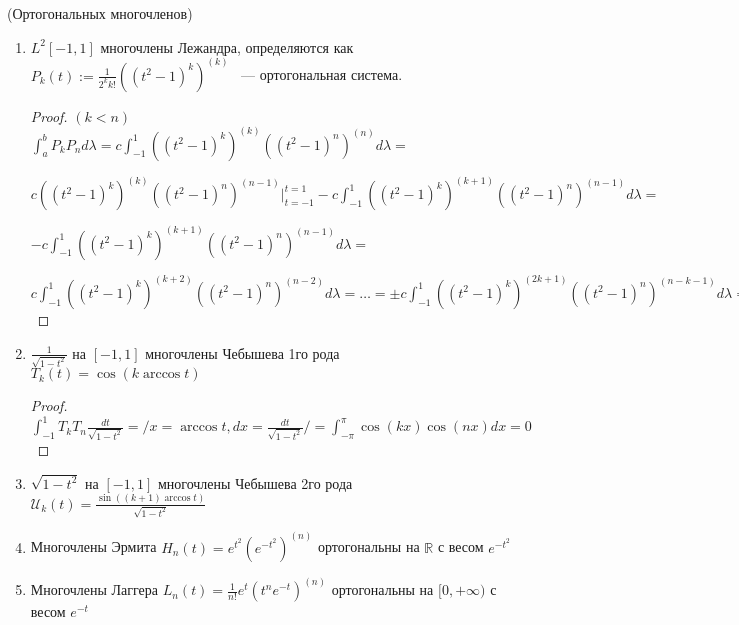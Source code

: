   \begin{examples} (Ортогональных многочленов)
  	\begin{enumerate}
		\item $L^2[-1, 1]$ многочлены Лежандра, определяются как $P_k(t) := \frac{1}{2^k k!}((t^2 - 1)^k)^{(k)}$ ~--- ортогональная система.
		
		\begin{proof}
		$(k < n)$ $\int_a^b P_k P_n d\lambda = c  \int_{-1}^1 ((t^2 - 1)^k)^{(k)}((t^2 - 1)^n)^{(n)} d\lambda
		=$
		
		$  c((t^2 - 1)^k)^{(k)}((t^2 - 1)^n)^{(n - 1)} \Big|_{t = -1}^{t = 1} -
		 c \int_{-1}^1 ((t^2 - 1)^k)^{(k + 1)}((t^2 - 1)^n)^{(n - 1)} d\lambda =$
		 
		 $ -
		 c \int_{-1}^1 ((t^2 - 1)^k)^{(k + 1)}((t^2 - 1)^n)^{(n - 1)} d\lambda =$
		 
		 $c \int_{-1}^1 ((t^2 - 1)^k)^{(k + 2)}((t^2 - 1)^n)^{(n - 2)} d\lambda = \ldots =
		 \pm c \int_{-1}^1 ((t^2 - 1)^k)^{(2k + 1)}((t^2 - 1)^n)^{(n - k - 1)} d\lambda= 0$
		 \end{proof}
		 
		 \item $\frac{1}{\sqrt{1 - t^2}}$ на $[-1, 1]$ многочлены Чебышева 1го рода 
		 $T_k(t) = \cos(k\arccos t)$
		 
		 \begin{proof}
		$\int_{-1}^1 T_k T_n \frac{dt}{\sqrt{1 - t^2}} =  / x = \arccos t, dx = \frac{dt}{\sqrt{1 - t^2}}/ =
		\int_{-\pi}^\pi \cos(kx)\cos(nx)dx = 0$
		
		 \end{proof}
		 
		  \item $\sqrt{1 - t^2}$ на $[-1, 1]$ многочлены Чебышева 2го рода 
		 $\mathcal{U}_k(t) = \frac{\sin((k+1)\arccos t)}{\sqrt{1-t^2}}$
		 
		 \item Многочлены Эрмита 
		 $H_n(t) = e^{t^2}(e^{-t^2})^{(n)}$ ортогональны на $\mathbb{R}$ с весом $e^{-t^2}$
		 
		 \item Многочлены Лаггера $L_n(t) = \frac{1}{n!}e^t(t^n e^{-t})^{(n)}$ ортогональны на
		 $[0, +\infty)$ с весом $e^{-t}$
	\end{enumerate}
  \end{examples}

\newpage

